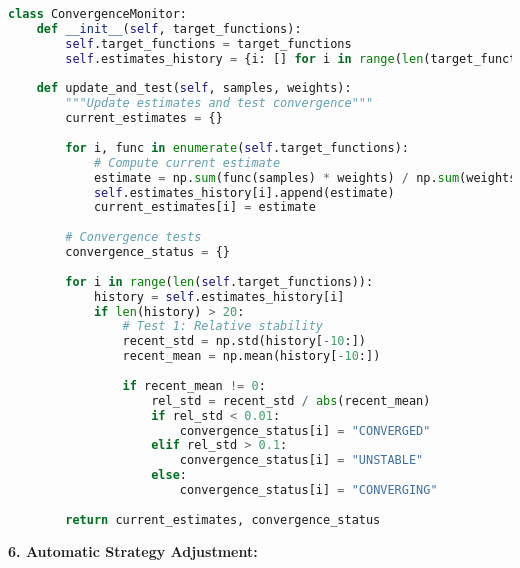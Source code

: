 \documentclass[11pt]{article}
\begin{document}
\begin{lstlisting}[language=Python, basicstyle=\small]
class ConvergenceMonitor:
    def __init__(self, target_functions):
        self.target_functions = target_functions
        self.estimates_history = {i: [] for i in range(len(target_functions))}
        
    def update_and_test(self, samples, weights):
        """Update estimates and test convergence"""
        current_estimates = {}
        
        for i, func in enumerate(self.target_functions):
            # Compute current estimate
            estimate = np.sum(func(samples) * weights) / np.sum(weights)
            self.estimates_history[i].append(estimate)
            current_estimates[i] = estimate
        
        # Convergence tests
        convergence_status = {}
        
        for i in range(len(self.target_functions)):
            history = self.estimates_history[i]
            if len(history) > 20:
                # Test 1: Relative stability
                recent_std = np.std(history[-10:])
                recent_mean = np.mean(history[-10:])
                
                if recent_mean != 0:
                    rel_std = recent_std / abs(recent_mean)
                    if rel_std < 0.01:
                        convergence_status[i] = "CONVERGED"
                    elif rel_std > 0.1:
                        convergence_status[i] = "UNSTABLE"
                    else:
                        convergence_status[i] = "CONVERGING"
        
        return current_estimates, convergence_status
\end{lstlisting}

\textbf{6. Automatic Strategy Adjustment:}
\end{document}
